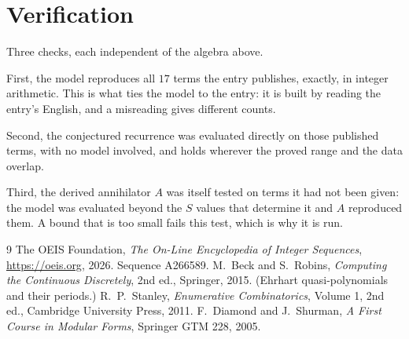 \documentclass[11pt,a4paper]{article}
\theoremstyle{plain}
\theoremstyle{definition}
\begin{document}
\section{Verification}

Three checks, each independent of the algebra above.

First, the model reproduces all $17$ terms the entry publishes, exactly, in integer
arithmetic. This is what ties the model to the entry: it is built by reading the entry's
English, and a misreading gives different counts.

Second, the conjectured recurrence was evaluated directly on those published terms, with no
model involved, and holds wherever the proved range and the data overlap.

Third, the derived annihilator $A$ was itself tested on terms it had not been given: the model
was evaluated beyond the $S$ values that determine it and $A$ reproduced them. A bound that is
too small fails this test, which is why it is run.

\begin{thebibliography}{9}
 The OEIS Foundation, \emph{The On-Line Encyclopedia of Integer
Sequences}, \url{https://oeis.org}, 2026. Sequence A266589.
 M.~Beck and S.~Robins, \emph{Computing the Continuous Discretely},
2nd ed., Springer, 2015. (Ehrhart quasi-polynomials and their periods.)
 R.~P.~Stanley, \emph{Enumerative Combinatorics}, Volume 1, 2nd ed.,
Cambridge University Press, 2011.
 F.~Diamond and J.~Shurman, \emph{A First Course in Modular Forms},
Springer GTM 228, 2005.
\end{thebibliography}
\end{document}

